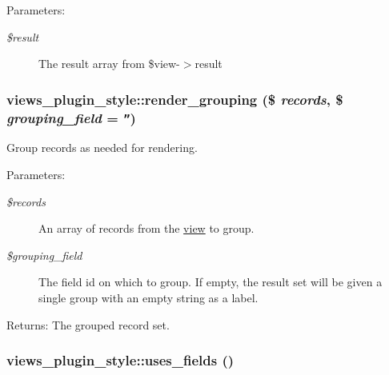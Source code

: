 \begin{Desc}
\item[Parameters:]
\begin{description}
\item[{\em \$result}]The result array from \$view-$>$result \end{description}
\end{Desc}
\hypertarget{classviews__plugin__style_76a269c0c69d94662fcbdb0ec4e4f09f}{
\subsubsection[{render\_\-grouping}]{\setlength{\rightskip}{0pt plus 5cm}views\_\-plugin\_\-style::render\_\-grouping (\$ {\em records}, \/  \$ {\em grouping\_\-field} = {\tt ''})}}
\label{classviews__plugin__style_76a269c0c69d94662fcbdb0ec4e4f09f}


Group records as needed for rendering.

\begin{Desc}
\item[Parameters:]
\begin{description}
\item[{\em \$records}]An array of records from the \hyperlink{classview}{view} to group. \item[{\em \$grouping\_\-field}]The field id on which to group. If empty, the result set will be given a single group with an empty string as a label. \end{description}
\end{Desc}
\begin{Desc}
\item[Returns:]The grouped record set. \end{Desc}
\hypertarget{classviews__plugin__style_04c6419f4049b7e2644904b5089f2e41}{
\subsubsection[{uses\_\-fields}]{\setlength{\rightskip}{0pt plus 5cm}views\_\-plugin\_\-style::uses\_\-fields ()}}
\label{classviews__plugin__style_04c6419f4049b7e2644904b5089f2e41}


